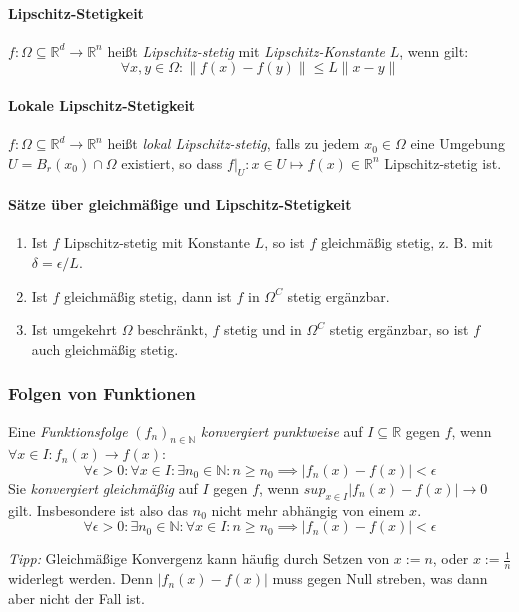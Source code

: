 \documentclass[a4paper, 9pt, DIV=24]{scrartcl}
\newcommand{\N}{\mathbb{N}}
\newcommand{\R}{\mathbb{R}}
\begin{document}
\paragraph{Lipschitz-Stetigkeit}
$f: \Omega \subseteq \R^d \rightarrow \R^n$ heißt \emph{Lipschitz-stetig} mit \emph{Lipschitz-Konstante} $L$, wenn gilt:
\[ \forall x,y\in\Omega: \|f(x)-f(y)\| \leq L\|x-y\|\]

\paragraph{Lokale Lipschitz-Stetigkeit}
$f: \Omega \subseteq \R^d \rightarrow \R^n$ heißt \emph{lokal Lipschitz-stetig},
falls zu jedem $x_0\in\Omega$ eine Umgebung $U = B_r(x_0)\cap\Omega$ existiert,
so dass $f|_U : x \in U \mapsto f(x) \in \R^n$ Lipschitz-stetig ist.


\paragraph{Sätze über gleichmäßige und Lipschitz-Stetigkeit}
\begin{enumerate}[label={(}\arabic*{)}]
 \item Ist $f$ Lipschitz-stetig mit Konstante $L$, so ist $f$ gleichmäßig stetig, z. B. mit $\delta = \epsilon/L$.
 \item Ist $f$ gleichmäßig stetig, dann ist $f$ in $\Omega^C$ stetig ergänzbar.
 \item Ist umgekehrt $\Omega$ beschränkt, $f$ stetig und in $\Omega^C$ stetig ergänzbar, so ist $f$ auch gleichmäßig stetig.
\end{enumerate}

\subsubsection{Folgen von Funktionen}
Eine \emph{Funktionsfolge} $(f_n)_{n\in\N}$ \emph{konvergiert punktweise} auf $I \subseteq \R$ gegen $f$, wenn $\forall x\in I: f_n(x) \rightarrow f(x)$:
\[ \forall \epsilon > 0: \forall x \in I: \exists n_0 \in \N: n \geq n_0 \implies |f_n(x)-f(x)| < \epsilon \]
Sie \emph{konvergiert gleichmäßig} auf $I$ gegen $f$, wenn $sup_{x\in I} |f_n(x) - f(x)| \rightarrow 0$ gilt.
Insbesondere ist also das $n_0$ nicht mehr abhängig von einem $x$.
\[ \forall \epsilon > 0: \exists n_0 \in \N: \forall x \in I: n \geq n_0 \implies |f_n(x)-f(x)| < \epsilon \]

\emph{Tipp: } Gleichmäßige Konvergenz kann häufig durch Setzen von $x := n$, oder $x := \frac{1}{n}$ widerlegt werden.
Denn $|f_n(x) - f(x)|$ muss gegen Null streben, was dann aber nicht der Fall ist.
\end{document}
